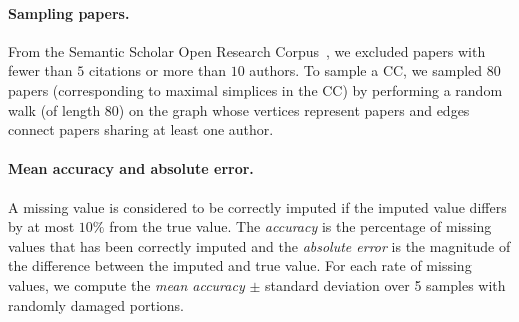 \paragraph{Sampling papers.}
From the Semantic Scholar Open Research Corpus~\cite{ammar18NAACL}, we excluded papers with fewer than $5$ citations or more than $10$ authors.
To sample a CC, we sampled $80$ papers (corresponding to maximal simplices in the CC) by performing a random walk (of length $80$) on the graph whose vertices represent papers and edges connect papers sharing at least one author.

\paragraph{Mean accuracy and absolute error.}
A missing value is considered to be correctly imputed if the imputed value differs by at most $10\%$ from the true value.
The \emph{accuracy} is the percentage of missing values that has been correctly imputed and the \emph{absolute error} is the magnitude of the difference between the imputed and true value.
For each rate of missing values, we compute the \emph{mean accuracy} $\pm$ standard deviation over 5 samples with randomly damaged portions.
